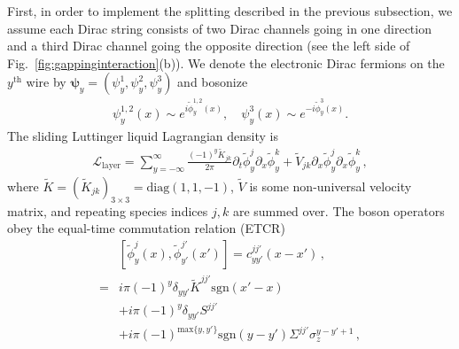 First, in order to implement the splitting described in the previous subsection, we assume each Dirac string consists of two Dirac channels going in one direction and a third Dirac channel going the opposite direction (see the left side of Fig.~\ref{fig:gappinginteraction}(b)). We denote the electronic Dirac fermions on the $y^{\mathrm{th}}$ wire by $\boldsymbol\psi_y=(\psi_y^1,\psi_y^2,\psi_y^3)$ and bosonize \begin{align}\psi_y^{1,2}(x)\sim e^{i\tilde\phi^{1,2}_y(x)},\quad\psi_y^3(x)\sim e^{-i\tilde\phi^3_y(x)}.\label{bosondef}\end{align} The sliding Luttinger liquid\cite{OHernLubenskyToner99,EmeryFradkinKivelsonLubensky00,VishwanathCarpentier01,SondhiYang01,MukhopadhyayKaneLubensky01} Lagrangian density is \begin{align}\mathcal{L}_{\mathrm{layer}}=\sum_{y=-\infty}^\infty\frac{(-1)^y\tilde{K}_{jk}}{2\pi}\partial_t\tilde\phi_y^j\partial_x\tilde\phi_y^k+\tilde{V}_{jk}\partial_x\tilde\phi_y^j\partial_x\tilde\phi_y^k \,, \label{Llayer}\end{align} where $\tilde{K}=(\tilde{K}_{jk})_{3\times3}=\mathrm{diag}(1,1,-1)$, $\tilde{V}$ is some non-universal velocity matrix, and repeating species indices $j,k$ are summed over. The boson operators obey the equal-time commutation relation (\hypertarget{ETCR}{ETCR}) \begin{align}&\left[\tilde\phi_y^j(x),\tilde\phi_{y'}^{j'}(x')\right]=c^{jj'}_{yy'}(x-x')\nonumber \,, \\=&i\pi(-1)^y\delta_{yy'}\tilde{K}^{jj'}\mathrm{sgn}(x'-x)\label{ETcomm0}\\&+i\pi(-1)^y\delta_{yy'}S^{jj'}\nonumber\\&+i\pi(-1)^{\mathrm{max}\{y,y'\}}\mathrm{sgn}(y-y')\Sigma^{jj'}\sigma_z^{y-y'+1}\nonumber\,, \end{align}
